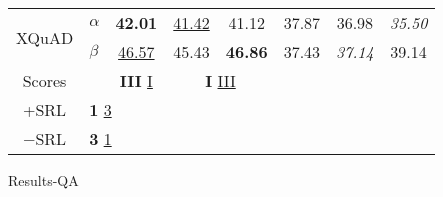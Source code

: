 {{\begin{tabular}{llccc|ccc}
    \multicolumn{1}{c}{\multirow{2}{*}{XQuAD}} & $\alpha$  & \multicolumn{1}{c|}{\textbf{42.01}}             & \multicolumn{1}{c}{\underline{41.42}} & \multicolumn{1}{c|}{41.12}             & \multicolumn{1}{c|}{37.87}          & \multicolumn{1}{c}{36.98}          & \multicolumn{1}{c}{\textit{35.50}} \\
    \multicolumn{1}{c}{}                       & $\beta$   & \multicolumn{1}{c|}{\underline{46.57}}          & \multicolumn{1}{c}{45.43}             & \multicolumn{1}{c|}{\textbf{46.86}}    & \multicolumn{1}{c|}{37.43}          & \multicolumn{1}{c}{\textit{37.14}} & \multicolumn{1}{c}{39.14}          \\ \hline\hline
    \multicolumn{1}{c}{Scores}                 &           & \multicolumn{1}{c|}{\textbf{III} \underline{I}} & \multicolumn{2}{c|}{\textbf{I} \underline{III}}                                & \multicolumn{1}{c|}{}               & \multicolumn{2}{c}{}                                                    \\ \cline{1-2}
    \multicolumn{1}{c}{+SRL}                   & \multicolumn{3}{l}{\textbf{1} \underline{3}} \\
    \multicolumn{1}{c}{$-$SRL}                 & \multicolumn{3}{l}{\textbf{3} \underline{1}}

    \end{tabular}
  }
}{Results-QA}

